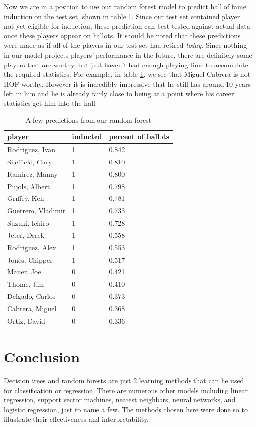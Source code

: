 \documentclass[preprint,12pt]{elsarticle}
\begin{document}
Now we are in a position to use our random forest model to predict hall of fame induction on the test set, shown in table \ref{rfplayers}. Since our test set contained player not yet eligible for induction, these prediction can best tested against actual data once these players appear on ballots. It should be noted that these predictions were made as if all of the players in our test set had retired \textit{today}. Since nothing in our model projects players' performance in the future, there are definitely some players that are worthy, but just haven't had enough playing time to accumulate the required statistics. For example, in table \ref{rfplayers}, we see that Miguel Cabrera is not HOF worthy. However it is incredibly impressive that he still has around 10 years left in him and he is already fairly close to being at a point where his career statistics get him into the hall.


\begin{table}[h]
\centering
\begin{tabular}{|l |l |l|}
\hline
player & inducted & percent of ballots\\
\hline
Rodriguez, Ivan & 1 & 0.842 \\
Sheffield, Gary & 1 & 0.810 \\
Ramirez, Manny & 1 & 0.800 \\
Pujols, Albert & 1 & 0.798 \\ 
Griffey, Ken & 1 & 0.781 \\
Guerrero, Vladimir & 1 & 0.733 \\
Suzuki, Ichiro & 1 & 0.728 \\
Jeter, Derek & 1 & 0.558 \\
Rodriguez, Alex & 1 & 0.553 \\
Jones, Chipper & 1 & 0.517 \\
Mauer, Joe & 0 & 0.421 \\
Thome, Jim & 0 & 0.410 \\
Delgado, Carlos & 0 & 0.373 \\
Cabrera, Miguel & 0 & 0.368 \\
Ortiz, David & 0 & 0.336 \\
\hline
\end{tabular}
\caption{A few predictions from our random forest}
\label{rfplayers}
\end{table}


 


\section{Conclusion}
Decision trees and random forests are just 2 learning methods that can be used for classification or regression. There are numerous other models including linear regression, support vector machines, nearest neighbors, neural networks, and logistic regression, just to name a few. The methods chosen here were done so to illustrate their effectiveness and interpretability.
\end{document}
